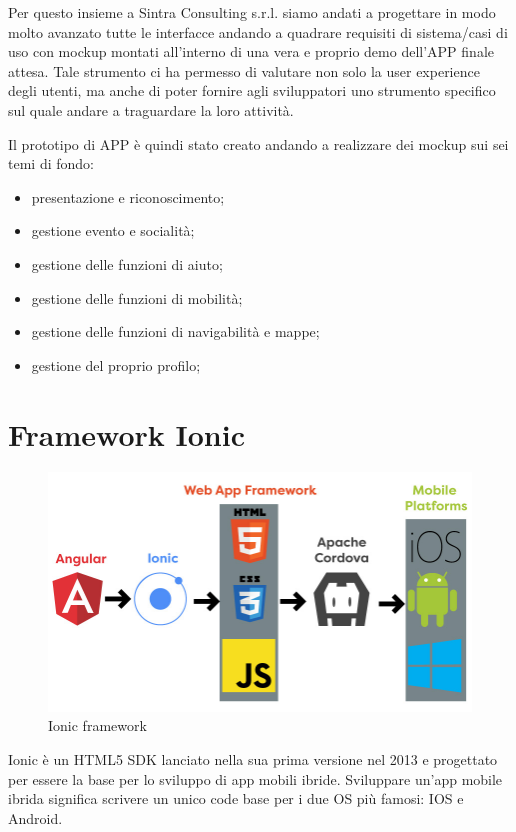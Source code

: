 Per questo insieme a Sintra Consulting s.r.l. siamo andati a progettare in modo molto avanzato tutte le interfacce andando a quadrare requisiti di sistema/casi di uso con mockup montati all’interno di una vera e proprio demo dell’APP finale attesa.
Tale strumento ci ha permesso di valutare non solo la user experience degli utenti, ma anche di poter fornire agli sviluppatori uno strumento specifico sul quale andare a traguardare la loro attività.

Il prototipo di APP è quindi stato creato andando a realizzare dei mockup sui sei temi di fondo:
\begin{itemize}
\item presentazione e riconoscimento;
\item gestione evento e socialità;
\item gestione delle funzioni di aiuto;
\item gestione delle funzioni di mobilità;
\item gestione delle funzioni di navigabilità e mappe;
\item gestione del proprio profilo;
\end{itemize}

\section{Framework Ionic}
\begin{figure}[h!]
    \centering  
    \caption{Ionic framework}
    \includegraphics[scale=0.4]{img/cap2/angular-ionic}
\end{figure}

Ionic è un HTML5 SDK lanciato nella sua prima versione nel 2013 e progettato per essere la base per lo sviluppo di app mobili ibride. 
Sviluppare un'app mobile ibrida significa scrivere un unico code base per i due OS più famosi: IOS e Android.

